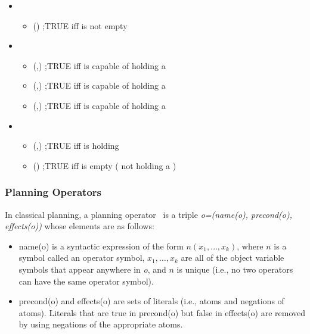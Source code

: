 \begin{itemize}
 \item {}
  \begin{itemize}
    \item {}() ;TRUE iff  is not empty
  \end{itemize}

 \item {}
  \begin{itemize}
    \item {}(,) ;TRUE iff  is capable of holding a 	
    \item {}(,) ;TRUE iff  is capable of holding a 
    \item {}(,) ;TRUE iff  is capable of holding a 
  \end{itemize}

 \item {}
  \begin{itemize}
    \item {}(,) ;TRUE iff  is holding 
    \item {}() ;TRUE iff  is empty ( not holding a )
  \end{itemize}
\end{itemize}


\subsubsection{Planning Operators}
 In classical planning, a planning operator~\cite{NAU.2004} is a triple \textit{o=(name(o), precond(o), effects(o))} whose elements are as follows:
\begin{itemize}
\item name(o) is a syntactic expression of the form $n(x_1,\dots,x_k)$, where $n$ is a symbol
called an operator symbol, $x_1,\dots,x_k$ are all of the object variable symbols that
appear anywhere in \textit{o}, and $n$ is unique (i.e., no two operators can have the
same operator symbol).
\item precond(o) and effects(o) are sets of literals (i.e., atoms and negations of atoms). Literals that are true in precond(o) but false in effects(o) are removed by using negations of the appropriate atoms.
\end{itemize}

